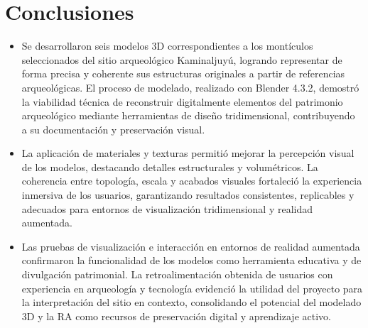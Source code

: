 
\section{Conclusiones}

\begin{itemize}
    \item  Se desarrollaron seis modelos 3D correspondientes a los montículos seleccionados del sitio arqueológico Kaminaljuyú, logrando representar de forma precisa y coherente sus estructuras originales a partir de referencias arqueológicas. El proceso de modelado, realizado con Blender 4.3.2, demostró la viabilidad técnica de reconstruir digitalmente elementos del patrimonio arqueológico mediante herramientas de diseño tridimensional, contribuyendo a su documentación y preservación visual.

    \item La aplicación de materiales y texturas permitió mejorar la percepción visual de los modelos, destacando detalles estructurales y volumétricos. La coherencia entre topología, escala y acabados visuales fortaleció la experiencia inmersiva de los usuarios, garantizando resultados consistentes, replicables y adecuados para entornos de visualización tridimensional y realidad aumentada.

    \item Las pruebas de visualización e interacción en entornos de realidad aumentada confirmaron la funcionalidad de los modelos como herramienta educativa y de divulgación patrimonial. La retroalimentación obtenida de usuarios con experiencia en arqueología y tecnología evidenció la utilidad del proyecto para la interpretación del sitio en contexto, consolidando el potencial del modelado 3D y la RA como recursos de preservación digital y aprendizaje activo.
\end{itemize}